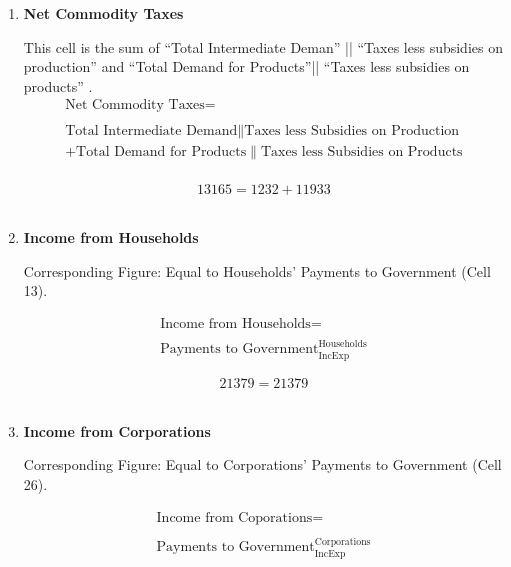 \begin{enumerate}
\item \textbf {Net Commodity Taxes}

This cell is the sum of ``Total Intermediate Deman'' || ``Taxes less subsidies on production'' and ``Total Demand for Products''|| ``Taxes less subsidies on products'' \cite{ScotGov2013a}.\\

\begin{equation}
\begin{split}
\text{Net Commodity Taxes} =  \\ \\
\text{Total Intermediate Demand}\|\text{Taxes less Subsidies on Production}\\
+\text{Total Demand for Products}\|\text{Taxes less Subsidies on Products}\\
\end{split} \label{eq:2.5.36}
\end{equation}

\begin{equation} \nonumber
13165 = 1232+11933
\end{equation}\\


\item \textbf {Income from Households}

Corresponding Figure: Equal to Households' Payments to Government (Cell 13).

\begin{equation}
\begin{split}
\text{Income from Households} =  \\ \\
\text{Payments to Government}^\text{Households}_\text{IncExp}
\end{split} \label{eq:2.5.37}
\end{equation}

\begin{equation} \nonumber
21379 = 21379
\end{equation}\\


\item \textbf {Income from Corporations}

Corresponding Figure: Equal to Corporations' Payments to Government (Cell 26).

\begin{equation}
\begin{split}
\text{Income from Coporations} =  \\ \\
\text{Payments to Government}^\text{Corporations}_\text{IncExp}
\end{split} \label{eq:2.5.38}
\end{equation}


\end{enumerate}
